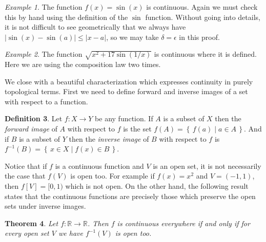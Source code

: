 \documentclass[11pt,oneside]{amsbook}
\newcommand{\set}[1]{\left\{\,#1\,\right\}}
\newcommand{\R}{\mathbb R}
\theoremstyle{definition}
\theoremstyle{plain}
\newtheorem{theorem}{Theorem}[section]
\theoremstyle{definition}
\newtheorem{definition}[theorem]{Definition}
\theoremstyle{remark}
\newtheorem{example}[theorem]{Example}
\numberwithin{equation}{section}
\numberwithin{figure}{section}
\begin{document}

\begin{example}
  The function $f(x)=\sin(x)$ is continuous. Again we must check this by hand using the definition of the $\sin$ function. Without going into details, it is not difficult to see geometrically that we always have $|\sin(x)-\sin(a)|\leq|x-a|$, so we may take $\delta=\epsilon$ in this proof.
\end{example}

\begin{example}
  The function $\sqrt{x^2+17\sin(1/x)}$ is continuous where it is defined. Here we are using the composition law two times.
\end{example}

We close with a beautiful characterization which expresses continuity in purely topological terms. First we need to define forward and inverse images of a set with respect to a function.

\begin{definition}
  Let $f\colon X\to Y$ be any function. If $A$ is a subset of $X$ then the \emph{forward image} of $A$ with respect to $f$ is the set $f(A)=\set{f(a)\mid a\in A}$. And if $B$ is a subset of $Y$ then the \emph{inverse image} of $B$ with respect to $f$ is $f^{-1}(B)=\set{x\in X\mid f(x)\in B}$.
\end{definition}

Notice that if $f$ is a continuous function and $V$ is an open set, it is not necessarily the case that $f(V)$ is open too. For example if $f(x)=x^2$ and $V=(-1,1)$, then $f[V]=[0,1)$ which is not open. On the other hand, the following result states that the continuous functions are precisely those which preserve the open sets under inverse images.

\begin{theorem}
  Let $f\colon\R\to\R$. Then $f$ is continuous everywhere if and only if for every open set $V$ we have $f^{-1}(V)$ is open too.
\end{theorem}
\end{document}

